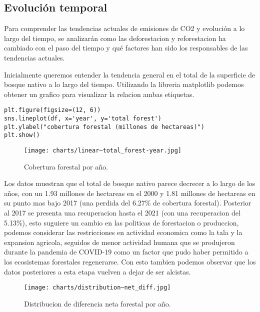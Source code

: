 \documentclass[11pt]{article}
\begin{document}
\subsection{Evolución temporal} \label{tab: Analisis 1 }
Para comprender las tendencias actuales de emisiones de CO2 y evolución a lo largo del tiempo, se analizarán como las deforestacion y reforestacion ha cambiado con el paso del tiempo y qué factores han sido los responsables de las tendencias actuales.

Inicialmente queremos entender la tendencia general en el total de la superficie de bosque nativo a lo largo del tiempo. Utilizando la libreria matplotlib podemos obtener un grafico para visualizar la relacion ambas etiquetas.

\begin{verbatim}
plt.figure(figsize=(12, 6))
sns.lineplot(df, x='year', y='total forest')
plt.ylabel("cobertura forestal (millones de hectareas)")
plt.show()
\end{verbatim}

\begin{figure}[H]
    \centering
    \texttt{[image: charts/linear--total\_forest-year.jpg]}
    \caption{Cobertura forestal por año.}
    \label{fig:lineal-anio-emisiones}
\end{figure}

Los datos muestran que el total de bosque nativo parece decrecer a lo largo de los años, con un 1.93 millones de hectareas en el 2000 y  1.81 millones de hectareas en su punto mas bajo 2017 (una perdida del 6.27\% de cobertura forestal). Posterior al 2017 se presenta una recuperacion hasta el 2021 (con una recuperacion del 5.13\%), esto suguiere un cambio en las politicas de forestacion o produccion, podemos considerar las restricciones en actividad economica como la tala y la expansion agricola, seguidos de menor actividad humana que se produjeron durante la pandemia de COVID-19 como un factor que pudo haber permitido a los ecosistemas forestales regenerarse. Con esto tambien podemos observar que los datos posteriores a esta etapa vuelven a dejar de ser alcistas.

\begin{figure}[H]
    \centering
    \texttt{[image: charts/distribution--net\_diff.jpg]}
    \caption{Distribucion de diferencia neta forestal por año.}
    \label{fig:tendencia-vehiculos-año}
\end{figure}
\end{document}
